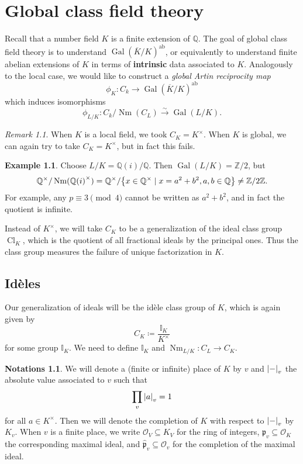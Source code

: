 \documentclass[leqno, openany]{memoir}
\theoremstyle{definition}
\newtheorem{exm}[thm]{Example}
\newtheorem{notns}[thm]{Notations}
\theoremstyle{remark}
\newtheorem{rmk}[thm]{Remark}
\theoremstyle{plain}
\theoremstyle{definition}
\theoremstyle{remark}
\newcommand{\Z}{\mathbb{Z}}
\newcommand{\Q}{\mathbb{Q}}
\newcommand{\I}{\mathbb{I}}
\newcommand{\mc}[1]{\mathcal{#1}}
\newcommand{\mf}[1]{\mathfrak{#1}}
\newcommand{\mr}[1]{\mathrm{#1}}
\newcommand{\ol}[1]{\overline{#1}}
\newcommand{\wh}[1]{\widehat{#1}}
\DeclareMathOperator{\Gal}{Gal}
\DeclareMathOperator{\Cl}{Cl}
\DeclareMathOperator{\Nm}{Nm}
\begin{document}
\chapter{Global class field theory}%

Recall that a number field $K$ is a finite extension of $\Q$. The goal of
global class field theory is to understand ${ \Gal(\ol{K}/K) }^{\mr{ab}}$, or
equivalently to understand finite abelian extensions of $K$ in terms of
\textbf{intrinsic} data associated to $K$. Analogously to the local case, we
would like to construct a \textit{global Artin reciprocity map} \[ \phi_K
\colon C_k \to {\Gal(\ol{K}/K)}^{\mr{ab}} \] which induces isomorphisms \[
\phi_{L/K} \colon C_k/\Nm(C_L) \xrightarrow{\sim} \Gal(L/K). \]

\begin{rmk} When $K$ is a local field, we took $C_K = K^{\times}$. When $K$ is
global, we can again try to take $C_K = K^{\times}$, but in fact this fails.
\end{rmk}

\begin{exm} Choose $L/K = \Q(i)/\Q$. Then $\Gal(L/K) = \Z/2$, but \[
\Q^{\times}/\Nm({\Q(i)}^{\times}) = \Q^{\times}/\qty{x \in \Q^{\times} \mid x =
a^2+b^2, a,b \in \Q} \neq \Z/2\Z. \] For example, any $p \equiv 3 \pmod 4$
cannot be written as $a^2+b^2$, and in fact the quotient is infinite.
\end{exm}

Instead of $K^{\times}$, we will take $C_K$ to be a generalization of the ideal
class group $\Cl_K$, which is the quotient of all fractional ideals by the
principal ones. Thus the class group measures the failure of unique
factorization in $K$.

\section{Id\`eles}%

Our generalization of ideals will be the id\`ele class group of $K$, which is
again given by \[ C_K \coloneqq \frac{\mathbb{I}_K}{K^{\times}} \] for some
group $\I_K$. We need to define $\I_K$ and $\Nm_{L/K} \colon C_L \to C_K$.

\begin{notns} We will denote a (finite or infinite) place of $K$ by $v$ and
    $\abs{-}_v$ the absolute value associated to $v$ such that \[ \prod_v
    \abs{a}_v = 1 \] for all $a \in K^{\times}$. Then we will denote the
    completion of $K$ with respect to $\abs{-}_v$ by $K_v$. When $v$ is a
    finite place, we write $\mc{O}_V \subseteq K_V$ for the ring of integers,
    $\mf{p}_v \subseteq \mc{O}_K$ the corresponding maximal ideal, and
    $\wh{\mf{p}}_v \subseteq \mc{O}_v$ for the completion of the maximal ideal.
\end{notns}
\end{document}
